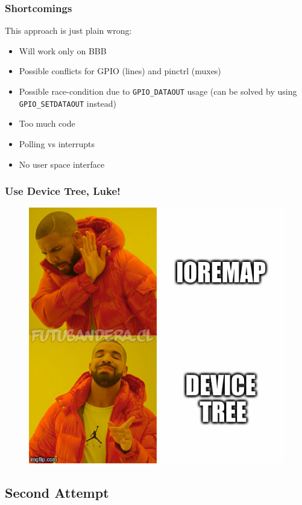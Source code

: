 \begin{frame}
  \frametitle{Shortcomings}
  This approach is just plain wrong:
  \begin{itemize}
    \item Will work only on BBB
    \item Possible conflicts for GPIO (lines) and pinctrl (muxes)
    \item Possible race-condition due to \texttt{GPIO\_DATAOUT} usage (can be
          solved by using \texttt{GPIO\_SETDATAOUT} instead)
    \item Too much code
    \item Polling vs interrupts
    \item No user space interface
  \end{itemize}
\end{frame}

\begin{frame}
  \frametitle{Use Device Tree, Luke!}
  \begin{figure}
    \centering
    \includegraphics[scale=0.4]{images/ioremap-device-tree.jpg}
  \end{figure}
  \vspace*{-10mm}
\end{frame}

\subsection{Second Attempt}

